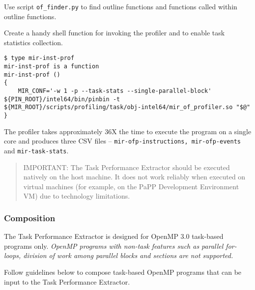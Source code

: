 \documentclass[11pt,a4paper]{article}
\begin{document}
Use script \texttt{of\_finder.py} to find outline functions and functions called within outline functions.

Create a handy shell function for invoking the profiler and to enable task statistics collection.

\begin{lstlisting}[style=MyInputStyle]
$ type mir-inst-prof 
mir-inst-prof is a function
mir-inst-prof () 
{ 
    MIR_CONF='-w 1 -p --task-stats --single-parallel-block' ${PIN_ROOT}/intel64/bin/pinbin -t ${MIR_ROOT}/scripts/profiling/task/obj-intel64/mir_of_profiler.so "$@"
}
\end{lstlisting}

The profiler takes approximately 36X  the time to execute the program on a single core and produces three CSV files -- \texttt{mir-ofp-instructions, mir-ofp-events} and \texttt{mir-task-stats}.

\begin{framed}
\begin{quote}
IMPORTANT: The Task Performance Extractor should be executed natively on the host machine. It does not work reliably when executed on virtual machines (for example, on the PaPP Development Environment VM) due to technology limitations.
\end{quote}
\end{framed}

\subsubsection{Composition}

The Task Performance Extractor is designed for OpenMP 3.0 task-based programs only. \emph{OpenMP programs with non-task features such as parallel for-loops, division of work among parallel blocks and sections are not supported.}

Follow guidelines below to compose task-based OpenMP programs that can be input to the Task Performance Extractor.
\end{document}
